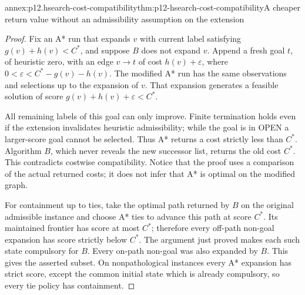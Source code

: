 \begin{annexitem}{annex:p12.hsearch-cost-compatibility}{thm:p12-hsearch-cost-compatibility}{A cheaper return value without an admissibility assumption on the extension}
\begin{proof}
Fix an A* run that expands \(v\) with current label satisfying
\(g(v)+h(v)<C^*\), and suppose \(B\) does not expand \(v\).
Append a fresh goal \(t\), of heuristic zero, with an edge
\(v\to t\) of cost \(h(v)+\varepsilon\), where
\(0<\varepsilon<C^*-g(v)-h(v)\). The modified A* run has the
same observations and selections up to the expansion of \(v\).
That expansion generates a feasible solution of score
\(g(v)+h(v)+\varepsilon<C^*\).

All remaining labels of this goal can only improve. Finite termination
holds even if the extension invalidates heuristic admissibility; while
the goal is in OPEN a larger-score goal cannot be selected. Thus A*
returns a cost strictly less than \(C^*\). Algorithm \(B\), which
never reveals the new successor list, returns the old cost \(C^*\).
This contradicts costwise compatibility. Notice that the proof uses a
comparison of the actual returned costs; it does not infer that A* is
optimal on the modified graph.

For containment up to ties, take the optimal path returned by \(B\)
on the original admissible instance and choose A* ties to advance this
path at score \(C^*\). Its maintained frontier has score at most
\(C^*\); therefore every off-path non-goal expansion has score
strictly below \(C^*\). The argument just proved makes each such
state compulsory for \(B\). Every on-path non-goal was also expanded
by \(B\). This gives the asserted subset. On nonpathological
instances every A* expansion has strict score, except the common initial
state which is already compulsory, so every tie policy has containment.
\end{proof}
\end{annexitem}

